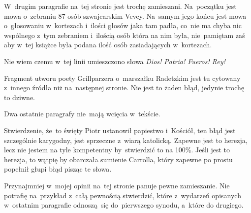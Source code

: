\documentclass[a4paper,11pt]{article}
\begin{document}
\vspace{\spaceFour}





\noindent
{} W~drugim paragrafie na~tej stronie jest trochę zamieszani.
Na~początku jest mowa o~zebraniu 87 osób szwajcarskim Vevey. Na~samym jego
końcu jest mowa o~głosowaniu w~kortezach i~ilości głosów jaka tam padła,
co~nie ma chyba nic wspólnego z~tym zebraniem i~ilością osób która na nim
była, nie~pamiętam zaś aby w~tej książce była podana ilość osób
zasiadających w~kortezach.

\vspace{\spaceFour}





\noindent
{} Nie wiem czemu w~tej linii umieszczono słowa \textit{Dios!
  Patria! Fueros! Rey!}

\vspace{\spaceFour}





\noindent
{} Fragment utworu poety Grillparzera o~marszałku Radetzkim jest tu
cytowany z~innego źródła niż na~następnej stronie. Nie jest to żaden błąd,
jedynie trochę to dziwne.

\vspace{\spaceFour}





\noindent
{} Dwa ostatnie paragrafy nie~mają wcięcia w~tekście.

\vspace{\spaceFour}





\noindent
{} Stwierdzenie, że~to święty Piotr ustanowił papiestwo i~Kościół,
ten błąd jest szczególnie karygodny, jest sprzeczne z~wiarą katolicką.
Zapewne jest to herezja, lecz nie jestem na tyle kompetentny by~stwierdzić
to na 100\%. Jeśli jest to herezja, to wątpię by obarczała sumienie
Carrolla, który zapewne po prostu popełnił głupi błąd pisząc te słowa.

\vspace{\spaceFour}





\noindent
{} Przynajmniej w~mojej opinii na~tej stronie panuje pewne
zamieszanie. Nie potrafię na~przykład z~całą pewnością
stwierdzić, które z~wydarzeń opisanych w~ostatnim paragrafie
odnoszą~się do~pierwszego synodu, a~które do drugiego.
\end{document}
